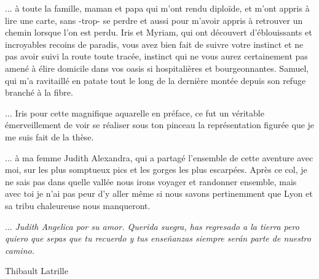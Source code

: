 $\hdots$ à toute la famille, maman et papa qui m’ont rendu diploïde, et m’ont appris à lire une carte, sans -trop- se perdre et aussi pour m’avoir appris à retrouver un chemin lorsque l'on est perdu.
Iris et Myriam, qui ont découvert d’éblouissants et incroyables recoins de paradis, vous avez bien fait de suivre votre instinct et ne pas avoir suivi la route toute tracée, instinct qui ne vous aurez certainement pas amené à élire domicile dans vos oasis si hospitalières et bourgeonnantes.
Samuel, qui m’a ravitaillé en patate tout le long de la dernière montée depuis son refuge branché à la fibre.

$\hdots$ Iris pour cette magnifique aquarelle en préface, ce fut un véritable émerveillement de voir se réaliser sous ton pinceau la représentation figurée que je me suis fait de la thèse.

$\hdots$ à ma femme Judith Alexandra, qui a partagé l’ensemble de cette aventure avec moi, sur les plus somptueux pics et les gorges les plus escarpées.
Après ce col, je ne sais pas dans quelle vallée nous irons voyager et randonner ensemble, mais avec toi je n’ai pas peur d’y aller même si nous savons pertinemment que Lyon et sa tribu chaleureuse nous manqueront.

$\hdots$ \textit{Judith Angelica por su amor. Querida suegra, has regresado a la tierra pero quiero que sepas que tu recuerdo y tus enseñanzas siempre serán parte de nuestro camino.}

\begin{flushright}
    Thibault Latrille
\end{flushright}
